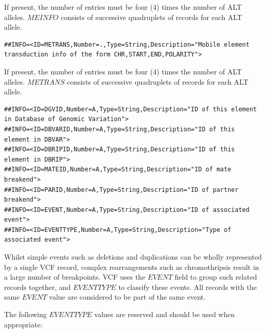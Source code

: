 \documentclass[8pt]{article}
\begin{document}
If present, the number of entries must be four (4) times the number of ALT alleles.
$MEINFO$ consists of successive quadruplets of records for each ALT allele.

\footnotesize
\begin{verbatim}
##INFO=<ID=METRANS,Number=.,Type=String,Description="Mobile element transduction info of the form CHR,START,END,POLARITY">
\end{verbatim}
\normalsize

If present, the number of entries must be four (4) times the number of ALT alleles.
$METRANS$ consists of successive quadruplets of records for each ALT allele.

\footnotesize
\begin{verbatim}
##INFO=<ID=DGVID,Number=A,Type=String,Description="ID of this element in Database of Genomic Variation">
##INFO=<ID=DBVARID,Number=A,Type=String,Description="ID of this element in DBVAR">
##INFO=<ID=DBRIPID,Number=A,Type=String,Description="ID of this element in DBRIP">
##INFO=<ID=MATEID,Number=A,Type=String,Description="ID of mate breakend">
##INFO=<ID=PARID,Number=A,Type=String,Description="ID of partner breakend">
##INFO=<ID=EVENT,Number=A,Type=String,Description="ID of associated event">
##INFO=<ID=EVENTTYPE,Number=A,Type=String,Description="Type of associated event">
\end{verbatim}
\normalsize

Whilst simple events such as deletions and duplications can be wholly represented by a single VCF record, complex rearrangements such as chromothripsis result in a large number of breakpoints.
VCF uses the $EVENT$ field to group such related records together, and $EVENTTYPE$ to classify these events.
All records with the same $EVENT$ value are considered to be part of the same event.

The following $EVENTTYPE$ values are reserved and should be used when appropriate:
\end{document}
